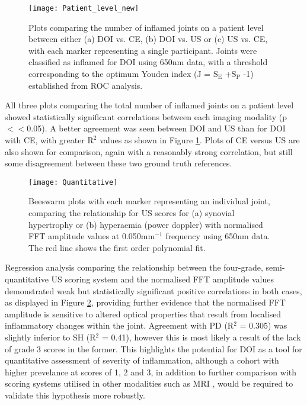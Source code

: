 \documentclass[twoside]{bhamthesis}
\theoremstyle{definition}
\begin{document}
\begin{figure}[!ht]
\centering\texttt{[image: Patient\_level\_new]}
\caption{Plots comparing the number of inflamed joints on a patient level between either (a) DOI vs. CE, (b) DOI vs. US or  (c) US vs. CE, with each marker representing a single participant. Joints were classified as inflamed for DOI using 650nm data, with a threshold corresponding to the optimum Youden index (J = $\mathrm{S_E}$ +$\mathrm{S_P}$ -1) established from ROC analysis.}
\label{fig:Patient_level}
\end{figure}

All three plots comparing the total number of inflamed joints on a patient level showed statistically significant correlations between each imaging modality (p$<<$0.05). A better agreement was seen between DOI and US than for DOI with CE, with greater $\mathrm{R^2}$ values as shown in Figure \ref{fig:Patient_level}. Plots of CE versus US are also shown for comparison, again with a reasonably strong correlation, but still some disagreement between these two ground truth references.

\begin{figure}[!ht]
\centering\texttt{[image: Quantitative]}
\caption{Beeswarm plots with each marker representing an individual joint, comparing the relationship for US scores for (a) synovial hypertrophy or (b) hyperaemia (power doppler) with normalised FFT amplitude values at 0.050mm$^{-1}$ frequency using 650nm data. The red line shows the first order polynomial fit.}
\label{fig:Quantitative}
\end{figure}
 
Regression analysis comparing the relationship between the four-grade, semi-quantitative US scoring system and the normalised FFT amplitude values demonstrated weak but statistically significant positive correlations in both cases, as displayed in Figure \ref{fig:Quantitative}, providing further evidence that the normalised FFT amplitude is sensitive to altered optical properties that result from localised inflammatory changes within the joint. Agreement with PD (R$^2$ = 0.305) was slightly inferior to SH (R$^2$ = 0.41), however this is most likely a result of the lack of grade 3 scores in the former. This highlights the potential for DOI as a tool for quantitative assessment of severity of inflammation, although a cohort with higher prevelance at scores of 1, 2 and 3, in addition to further comparison with scoring systems utilised in other modalities such as MRI \cite{ostergaard2003omeract}, would be required to validate this hypothesis more robustly. 
\end{document}
